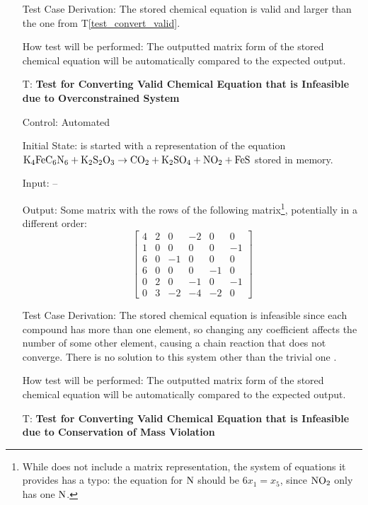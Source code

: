 \documentclass[12pt, titlepage]{article}
\newcounter{testnum} %
\newcommand{\testref}[1]{T\ref{#1}}
\begin{document}
\begin{enumerate}
    Test Case Derivation: The stored chemical equation is
    valid and larger than the one from \testref{test_convert_valid}.

    How test will be performed: The outputted matrix form of the stored
    chemical equation will be automatically compared to the expected output.

  \item[T\refstepcounter{testnum}\thetestnum \label{test_convert_inf_over_valid}:]
    \textbf{Test for Converting Valid Chemical Equation that is Infeasible due
      to Overconstrained System}

    Control: Automated

    Initial State: \progname{} is started with a representation of the equation
    $\ce{K4FeC6N6} + \ce{K2S2O3} \rightarrow \ce{CO2} + \ce{K2SO4} + \ce{NO2} +
      \ce{FeS}$ \cite{hamid_balancing_2019} stored in memory.

    Input: --

    Output: Some matrix with the rows of the following matrix\footnote{While
      \cite{hamid_balancing_2019} does not include a matrix representation, the
      system of equations it provides has a typo: the equation for $\ce{N}$
      should be $6x_1 = x_5$, since $\ce{NO2}$ only has one $\ce{N}$.},
    potentially in a different order:
    $$\begin{bmatrix}
        4 & 2 & 0  & -2 & 0  & 0  \\
        1 & 0 & 0  & 0  & 0  & -1 \\
        6 & 0 & -1 & 0  & 0  & 0  \\
        6 & 0 & 0  & 0  & -1 & 0  \\
        0 & 2 & 0  & -1 & 0  & -1 \\
        0 & 3 & -2 & -4 & -2 & 0
      \end{bmatrix}$$

    Test Case Derivation: The stored chemical equation is infeasible since
    each compound has more than one element, so changing any coefficient
    affects the number of some other element, causing a chain reaction that
    does not converge. There is no solution to this system other than the
    trivial one \cite{hamid_balancing_2019}.

    How test will be performed: The outputted matrix form of the stored
    chemical equation will be automatically compared to the expected output.

  \item[T\refstepcounter{testnum}\thetestnum \label{test_convert_inf_cons_mass_valid}:]
    \textbf{Test for Converting Valid Chemical Equation that is Infeasible due
      to Conservation of Mass Violation}


\end{enumerate}
\end{document}
